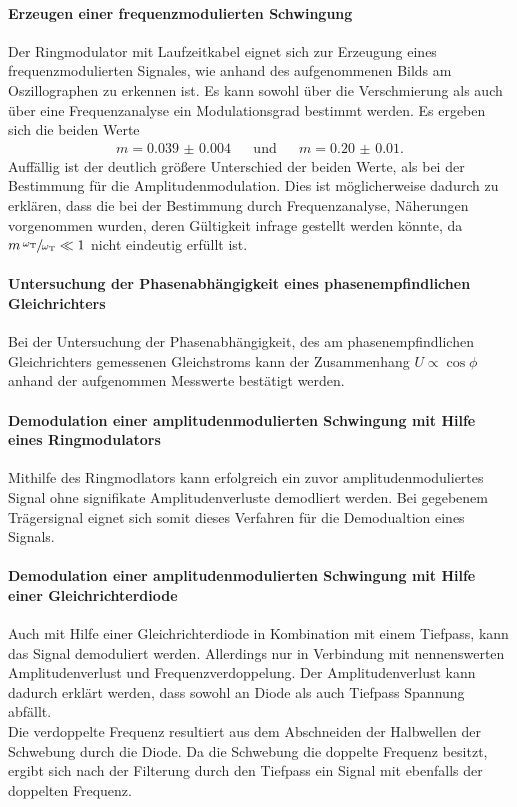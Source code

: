 \paragraph{Erzeugen einer frequenzmodulierten Schwingung}
Der Ringmodulator mit Laufzeitkabel eignet sich zur Erzeugung
eines frequenzmodulierten Signales, wie anhand des aufgenommenen Bilds
am Oszillographen zu erkennen ist.
Es kann sowohl über
die Verschmierung als auch über eine Frequenzanalyse
ein Modulationsgrad bestimmt werden.
Es ergeben sich die beiden Werte
\begin{align}
  m = \num{0.039(4)}& &\text{und}& &m=\num{0.20(1)}.
\end{align}
Auffällig ist der deutlich größere Unterschied der beiden Werte,
als bei der Bestimmung für die Amplitudenmodulation.
Dies ist möglicherweise dadurch zu erklären, dass
die bei der Bestimmung durch Frequenzanalyse, Näherungen vorgenommen
wurden, deren Gültigkeit infrage gestellt werden könnte, da
$m \, \sfrac{\omega_{\text{T}}}{\omega_{\text{T}}}\ll1$
nicht eindeutig erfüllt ist.

\paragraph{Untersuchung der Phasenabhängigkeit eines
phasenempfindlichen Gleichrichters}
Bei der Untersuchung der Phasenabhängigkeit, des am phasenempfindlichen
Gleichrichters gemessenen Gleichstroms kann der Zusammenhang $U \propto \cos \phi$ anhand der
aufgenommen Messwerte bestätigt werden.

\paragraph{Demodulation einer amplitudenmodulierten Schwingung
mit Hilfe eines Ringmodulators}
Mithilfe des Ringmodlators kann erfolgreich
ein zuvor amplitudenmoduliertes Signal ohne signifikate Amplitudenverluste
demodliert werden.
Bei gegebenem Trägersignal eignet sich somit dieses Verfahren für die
Demodualtion eines Signals.

\paragraph{Demodulation einer amplitudenmodulierten Schwingung
mit Hilfe einer Gleichrichterdiode}
Auch mit Hilfe einer Gleichrichterdiode in Kombination mit einem
Tiefpass, kann das Signal demoduliert werden.
Allerdings nur in Verbindung mit nennenswerten
Amplitudenverlust und Frequenzverdoppelung.
Der Amplitudenverlust kann dadurch erklärt werden, dass sowohl
an Diode als auch Tiefpass Spannung abfällt.\\
Die verdoppelte Frequenz resultiert aus dem Abschneiden
der Halbwellen der Schwebung durch die Diode.
Da die Schwebung die doppelte Frequenz besitzt, ergibt sich nach der Filterung
durch den Tiefpass ein Signal mit ebenfalls der doppelten Frequenz.

